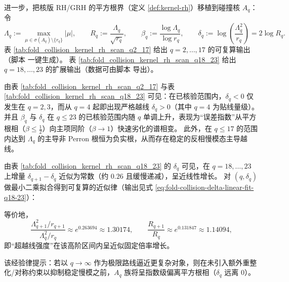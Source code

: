 
进一步，把核版 RH/GRH 的平方根界（定义 \ref{def:kernel-rh}）移植到碰撞核 \(A_q\)：令
\[
\Lambda_q:=\max_{\mu\in\sigma(A_q)\setminus\{r_q\}}|\mu|,
\qquad
R_q:=\frac{\Lambda_q}{\sqrt{r_q}},
\qquad
\beta_q:=\frac{\log \Lambda_q}{\log r_q},
\qquad
\delta_q:=\log\!\left(\frac{\Lambda_q^2}{r_q}\right)=2\log R_q.
\]
表 \ref{tab:fold_collision_kernel_rh_scan_q2_17} 给出 \(q=2,\dots,17\) 的可复算输出（脚本  一键生成）。
表 \ref{tab:fold_collision_kernel_rh_scan_q18_23} 给出 \(q=18,\dots,23\) 的扩展输出（数据可由脚本  导出）。



\begin{remark}[从 \texorpdfstring{$q=4$}{q=4} 起的系统性越线与快速劣化]\label{rem:pom-collision-kernel-rh-phase}
由表 \ref{tab:fold_collision_kernel_rh_scan_q2_17} 与表 \ref{tab:fold_collision_kernel_rh_scan_q18_23} 可见：在已核验范围内，\(\delta_q<0\) 仅发生在 \(q=2,3\)，而从 \(q=4\) 起即出现严格越线 \(\delta_q>0\)（其中 \(q=4\) 为贴线量级）。
并且 \(\beta_q\) 与 \(\delta_q\) 在 \(q\le 23\) 的已核验范围内随 \(q\) 单调上升，表现为“误差指数”从平方根相（\(\beta\le\frac12\)）向主项同阶（\(\beta\to 1\)）快速劣化的谱相变。
此外，在 \(q\le 17\) 的范围内达到 \(\Lambda_q\) 的主导非 Perron 根恒为负实根，从而存在稳定的反相慢模态主导越线。
\end{remark}

\begin{remark}[高阶 \texorpdfstring{$\delta_q$}{deltaq} 的近线性律（\(q=18,\dots,23\)）]\label{rem:pom-collision-kernel-rh-linear}
由表 \ref{tab:fold_collision_kernel_rh_scan_q18_23} 的 \(\delta_q\) 可见，在 \(q=18,\dots,23\) 上增量
\(\delta_{q+1}-\delta_q\) 近似为常数（约 \(0.26\) 且缓慢递减），呈近线性增长。
对 \((q,\delta_q)\) 做最小二乘拟合得到可复算的近似律（输出见式 \eqref{eq:fold-collision-delta-linear-fit-q18-23}）：

等价地，
\[
\frac{\Lambda_{q+1}^2/r_{q+1}}{\Lambda_q^2/r_q}\approx e^{0.263694}\approx 1.30174,
\qquad
\frac{R_{q+1}}{R_q}\approx e^{0.131847}\approx 1.14094,
\]
即“超越线强度”在该高阶区间内呈近似固定倍率增长。
\par
该经验律提示：若以 \(q\to\infty\) 作为极限路线逼近更复杂对象，则在未引入额外重整化/对称约束以抑制稳定慢模之前，\(A_q\) 族将呈指数级偏离平方根相（\(\delta_q\) 远离 \(0\)）。
\end{remark}

